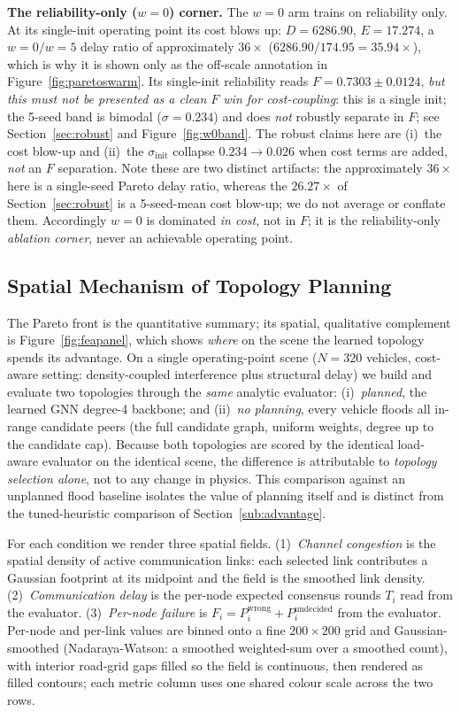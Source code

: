 \documentclass[journal]{IEEEtran}
\newcommand{\sinit}{\ensuremath{\sigma_{\mathrm{init}}}}
\begin{document}
\textbf{The reliability-only ($w{=}0$) corner.} The $w{=}0$ arm
trains on reliability only. At its single-init operating point its cost blows
up: $D=6286.90$, $E=17.274$, a $w{=}0/w{=}5$ delay ratio of approximately $36\times$
($6286.90/174.95=35.94\times$), which is why it is shown only as the off-scale
annotation in Figure~\ref{fig:paretoswarm}. Its single-init reliability reads
$F=0.7303\pm0.0124$, \emph{but this must not be presented as a clean $F$ win for
cost-coupling}: this is a single init; the 5-seed band is bimodal
($\sigma=0.234$) and does \emph{not} robustly separate in $F$; see
Section~\ref{sec:robust} and Figure~\ref{fig:w0band}. The robust claims here
are (i)~the cost blow-up and (ii)~the $\sinit$ collapse $0.234\to0.026$ when cost
terms are added, \emph{not} an $F$ separation. Note these are two distinct
artifacts: the approximately $36\times$ here is a single-seed Pareto delay ratio,
whereas the $26.27\times$ of Section~\ref{sec:robust} is a 5-seed-mean cost
blow-up; we do not average or conflate them. Accordingly $w{=}0$ is dominated
\emph{in cost}, not in $F$; it is the reliability-only \emph{ablation corner},
never an achievable operating point.

\subsection{Spatial Mechanism of Topology Planning}\label{sub:spatial}

The Pareto front is the quantitative summary; its spatial, qualitative complement
is Figure~\ref{fig:feapanel}, which shows \emph{where} on the scene the learned
topology spends its advantage. On a single operating-point scene ($N{=}320$
vehicles, cost-aware setting: density-coupled interference plus structural delay)
we build and evaluate two topologies through
the \emph{same} analytic evaluator: (i)~\emph{planned}, the learned GNN degree-4
backbone; and (ii)~\emph{no planning}, every vehicle floods all in-range
candidate peers (the full candidate graph, uniform weights, degree up to the
candidate cap). Because both topologies are scored by the identical load-aware
evaluator on the identical scene, the difference is attributable to \emph{topology
selection alone}, not to any change in physics. This comparison against an
unplanned flood baseline isolates the value of planning itself and is distinct
from the tuned-heuristic comparison of Section~\ref{sub:advantage}.

For each condition we render three spatial fields. (1)~\emph{Channel congestion}
is the spatial density of active communication links: each selected link
contributes a Gaussian footprint at its midpoint and the field is the smoothed
link density. (2)~\emph{Communication delay} is the per-node expected consensus
rounds $T_i$ read from the evaluator. (3)~\emph{Per-node failure} is
$F_i=P^{\mathrm{wrong}}_i+P^{\mathrm{undecided}}_i$ from the evaluator. Per-node
and per-link values are binned onto a fine $200{\times}200$ grid and
Gaussian-smoothed (Nadaraya-Watson: a smoothed weighted-sum over a smoothed
count), with interior road-grid gaps filled so the field is continuous, then
rendered as filled contours; each metric column uses one shared colour scale
across the two rows.
\end{document}

